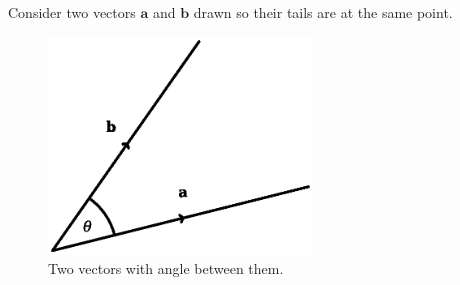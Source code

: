 \documentclass[12pt,a4paper]{article}
\newcommand{\gm}{0.625}
\newcommand{\gm}{0.5}
\newcommand{\nextalt}[1]{}
\theoremstyle{clearprint}
\newcommand{\bvec}[1]{\mathrm{\mathbf{#1}}}
\begin{document}
Consider two vectors \(\bvec{a}\) and \(\bvec{b}\) drawn so their tails are at the same point. 
\begin{figure}[!h]
\begin{center}
\nextalt{Two vectors, labelled a and b, are drawn as line segments. Their start points coincide and their end points do not. There is an acute angle of theta between them. Each line segment has an arrow on it pointing from the start point to the end point.}
\includegraphics[width=\gm\textwidth]{vectors.eps}
\end{center}
\caption{Two vectors with angle between them.}
\label{test}
\end{figure}
\end{document}
